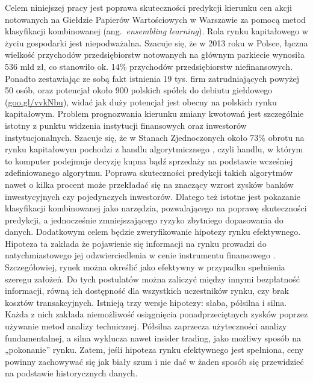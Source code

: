 \documentclass[12pt,a4paper,twoside,openany]{book}
\begin{document}
Celem niniejszej pracy jest poprawa skuteczności predykcji kierunku cen akcji notowanych na Giełdzie Papierów Wartościowych w Warszawie za pomocą metod klasyfikacji kombinowanej (ang.~\textit{ensembling learning}). Rola rynku kapitałowego w życiu gospodarki jest niepodważalna. Szacuje się, że w 2013 roku w Polsce, łączna wielkość przychodów przedsiębiorstw notowanych na głównym parkiecie wynosiła 536 mld zł, co stanowiło ok. 14\% przychodów przedsiębiorstw niefinansowych. Ponadto zestawiając ze sobą fakt istnienia 19 tys. firm zatrudniających powyżej 50 osób, oraz potencjał około 900 polskich spółek do debiutu giełdowego (\url{goo.gl/vvkNbu}), widać jak duży potencjał jest obecny na polskich rynku kapitałowym. Problem prognozwania kierunku zmiany kwotowań jest szczególnie istotny z punktu widzenia instytucji finansowych oraz inwestorów instytucjonalnych. Szacuje się, że w Stanach Zjednoczonych około 73\% obrotu na rynku kapitałowym pochodzi z handlu algorytmicznego \citep{mackenzie2009}, czyli handlu, w którym to komputer podejmuje decyzję kupna bądź sprzedaży na podstawie wcześniej zdefiniowanego algorytmu. Poprawa skuteczności predykcji takich algorytmów nawet o kilka procent może przekładać się na znaczący wzrost zysków banków inwestycyjnych czy pojedynczych inwestorów. Dlatego też istotne jest pokazanie klasyfikacji kombinowanej jako narzędzia, pozwalającego na poprawę skuteczności predykcji, a jednocześnie zmniejszającego ryzyko zbytniego dopasowania do danych. Dodatkowym celem będzie zweryfikowanie hipotezy rynku efektywnego. Hipoteza ta zakłada że pojawienie się informacji na rynku prowadzi do natychmiastowego jej odzwierciedlenia w cenie instrumentu finansowego \citep{basu1977}. Szczegółowiej, rynek można określić jako efektywny w przypadku spełnienia szeregu założeń. Do tych postulatów można zaliczyć między innymi bezpłatność informacji, równą ich dostępność dla wszystkich uczestników rynku, czy brak kosztów transakcyjnych. Istnieją trzy wersje hipotezy: słaba, półsilna i silna. Każda z nich zakłada niemożliwość osiągnięcia ponadprzeciętnych zysków poprzez używanie metod analizy technicznej. Półsilna zaprzecza użyteczności analizy fundamentalnej, a silna wyklucza nawet insider trading, jako możliwy sposób na „pokonanie” rynku. Zatem, jeśli hipoteza rynku efektywnego jest spełniona, ceny powinny zachowywać się jak biały szum i nie dać w żaden sposób się przewidzieć na podstawie historycznych danych. 
\end{document}
